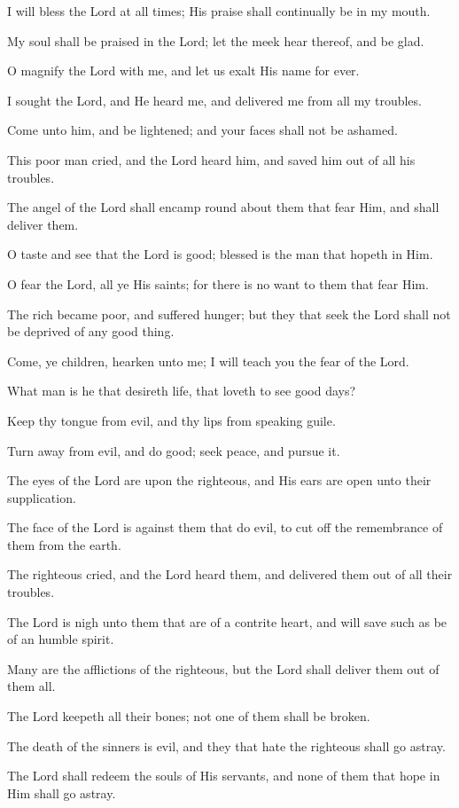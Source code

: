 I will bless the Lord at all times; His praise shall continually be in my mouth.

My soul shall be praised in the Lord; let the meek hear thereof, and be glad.

O magnify the Lord with me, and let us exalt His name for ever.

I sought the Lord, and He heard me, and delivered me from all my troubles.

Come unto him, and be lightened; and your faces shall not be ashamed.

This poor man cried, and the Lord heard him, and saved him out of all his troubles.

The angel of the Lord shall encamp round about them that fear Him, and shall deliver them.

O taste and see that the Lord is good; blessed is the man that hopeth in Him.

O fear the Lord, all ye His saints; for there is no want to them that fear Him.

The rich became poor, and suffered hunger; but they that seek the Lord shall not be deprived of any good thing.

Come, ye children, hearken unto me; I will teach you the fear of the Lord.

What man is he that desireth life, that loveth to see good days?

Keep thy tongue from evil, and thy lips from speaking guile.

Turn away from evil, and do good; seek peace, and pursue it.

The eyes of the Lord are upon the righteous, and His ears are open unto their supplication.

The face of the Lord is against them that do evil, to cut off the remembrance of them from the earth.

The righteous cried, and the Lord heard them, and delivered them out of all their troubles.

The Lord is nigh unto them that are of a contrite heart, and will save such as be of an humble spirit.

Many are the afflictions of the righteous, but the Lord shall deliver them out of them all.

The Lord keepeth all their bones; not one of them shall be broken.

The death of the sinners is evil, and they that hate the righteous shall go astray.

The Lord shall redeem the souls of His servants, and none of them that hope in Him shall go astray.
